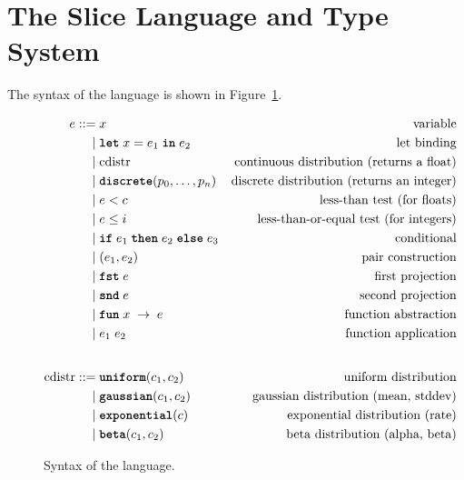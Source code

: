 \documentclass[acmsmall,screen,dvipsnames,x11names,nonacm,anonymous,review]{acmart}
\newcommand{\letkw}{\text{\ttfamily\bfseries let}}
\newcommand{\inkw}{\text{\ttfamily\bfseries in}}
\newcommand{\ifkw}{\text{\ttfamily\bfseries if}}
\newcommand{\thenkw}{\text{\ttfamily\bfseries then}}
\newcommand{\elsekw}{\text{\ttfamily\bfseries else}}
\newcommand{\uniform}{\text{\ttfamily\bfseries uniform}}
\newcommand{\discrete}{\text{\ttfamily\bfseries discrete}}
\newcommand{\gaussian}{\text{\ttfamily\bfseries gaussian}}
\newcommand{\exponential}{\text{\ttfamily\bfseries exponential}}
\newcommand{\betafn}{\text{\ttfamily\bfseries beta}} %
\newcommand{\fstkw}{\text{\ttfamily\bfseries fst}}
\newcommand{\sndkw}{\text{\ttfamily\bfseries snd}}
\newcommand{\funkw}{\text{\ttfamily\bfseries fun}}
\newcommand{\Slice}{\text{\scshape Slice}\xspace}
\begin{document}
\section{The Slice Language and Type System}\label{sec:language}

The syntax of the \Slice language is shown in Figure~\ref{fig:grammar}.

\begin{figure}[h]
\begin{align*}
e ::= &\; x                               & \text{variable} \\
    | &\; \letkw \; x = e_1\; \inkw \; e_2  & \text{let binding} \\
    | &\; \text{cdistr}                   & \text{continuous distribution (returns a float)} \\
    | &\; \discrete(p_0, \ldots, p_{n})      & \text{discrete distribution (returns an integer)} \\
    | &\; e < c                           & \text{less-than test (for floats)} \\
    | &\; e \leq i                           & \text{less-than-or-equal test (for integers)} \\
    | &\; \ifkw \; e_1\; \thenkw \; e_2\; \elsekw \; e_3 & \text{conditional} \\
    | &\; (e_1, e_2)                      & \text{pair construction} \\
    | &\; \fstkw \; e                       & \text{first projection} \\
    | &\; \sndkw \; e                       & \text{second projection} \\
    | &\; \funkw \; x \; \rightarrow \; e    & \text{function abstraction} \\
    | &\; e_1 \; e_2                      & \text{function application} \\
    \\[1ex] %
\text{cdistr} ::= &\; \uniform(c_1, c_2)      & \text{uniform distribution} \\
           | &\; \gaussian(c_1, c_2)   & \text{gaussian distribution (mean, stddev)} \\
           | &\; \exponential(c)      & \text{exponential distribution (rate)} \\
           | &\; \betafn(c_1, c_2)      & \text{beta distribution (alpha, beta)}
\end{align*}
\caption{Syntax of the \Slice language.}
\label{fig:grammar}
\end{figure}
\end{document}
